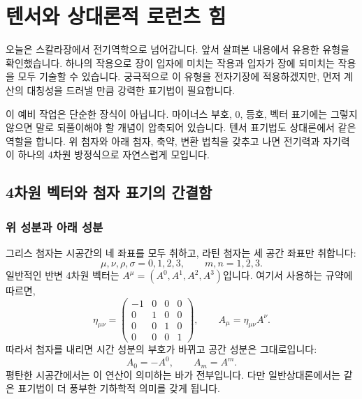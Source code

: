\chapter{텐서와 상대론적 로런츠 힘}

오늘은 스칼라장에서 전기역학으로 넘어갑니다. 앞서 살펴본 내용에서 유용한 유형을 확인했습니다. 하나의 작용으로 장이 입자에 미치는 작용과 입자가 장에 되미치는 작용을 모두 기술할 수 있습니다. 궁극적으로 이 유형을 전자기장에 적용하겠지만, 먼저 계산의 대칭성을 드러낼 만큼 강력한 표기법이 필요합니다.

이 예비 작업은 단순한 장식이 아닙니다. 마이너스 부호, 0, 등호, 벡터 표기에는 그렇지 않으면 말로 되풀이해야 할 개념이 압축되어 있습니다. 텐서 표기법도 상대론에서 같은 역할을 합니다. 위 첨자와 아래 첨자, 축약, 변환 법칙을 갖추고 나면 전기력과 자기력이 하나의 4차원 방정식으로 자연스럽게 모입니다.

\section{4차원 벡터와 첨자 표기의 간결함}

\subsection{위 성분과 아래 성분}

그리스 첨자는 시공간의 네 좌표를 모두 취하고, 라틴 첨자는 세 공간 좌표만 취합니다:
\begin{equation}
\mu,\nu,\rho,\sigma=0,1,2,3,
\qquad
m,n=1,2,3.
\end{equation}
일반적인 반변 4차원 벡터는 \(A^\mu=(A^0,A^1,A^2,A^3)\)입니다.
여기서 사용하는 규약에 따르면,
\begin{equation}
\eta_{\mu\nu}
=
\begin{pmatrix}
-1&0&0&0\\
0&1&0&0\\
0&0&1&0\\
0&0&0&1
\end{pmatrix},
\qquad
A_\mu=\eta_{\mu\nu}A^\nu .
\label{eq:sr6-metric-lowering}
\end{equation}
따라서 첨자를 내리면 시간 성분의 부호가 바뀌고 공간 성분은 그대로입니다:
\begin{equation}
A_0=-A^0,
\qquad
A_m=A^m.
\label{eq:sr6-component-lowering}
\end{equation}
평탄한 시공간에서는 이 연산이 의미하는 바가 전부입니다. 다만 일반상대론에서는 같은 표기법이 더 풍부한 기하학적 의미를 갖게 됩니다.

